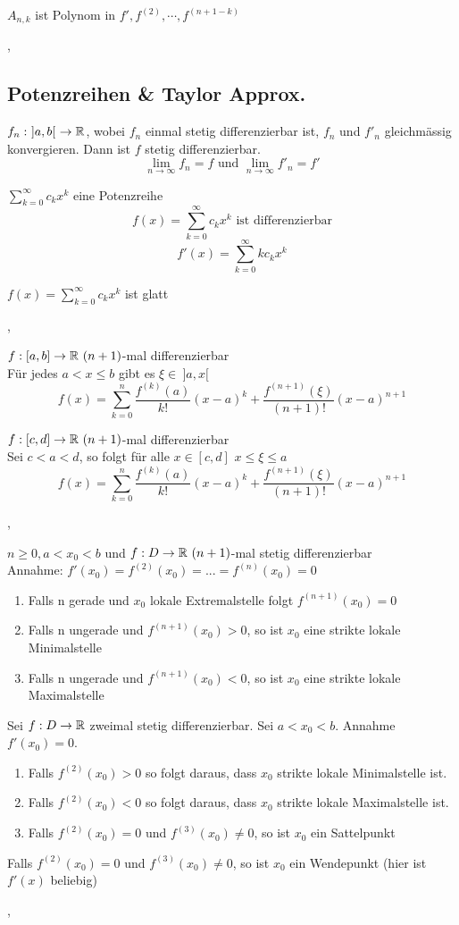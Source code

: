 \Bem $A_{n, k}$ ist Polynom in $f', f^{(2)}, \cdots , f^{(n + 1 - k)}$

\sep

\subsection{Potenzreihen \& Taylor Approx.}

\Satz[4.4.1] $f_n : \ ]a, b[ \ \rightarrow \mathbb{R}$, wobei $f_n$ einmal stetig differenzierbar ist, $f_n$ und $f'_n$ gleichmässig konvergieren. Dann ist $f$ stetig differenzierbar.
\[ \lim\limits_{n \rightarrow \infty} f_n = f \text{ und } \lim\limits_{n \rightarrow \infty} f'_n = f' \]

\Satz[4.4.2] $ \sum_{k= 0}^\infty c_k x^k$ eine Potenzreihe
\[ f(x) = \sum_{k= 0}^\infty c_k x^k \text{ ist differenzierbar} \]
\[f'(x) = \sum_{k= 0}^\infty k c_k x^k\]

\Korollar[4.4.3] $f(x) = \sum_{k= 0}^\infty c_k x^k$ ist glatt 

\sep

\Satz[4.4.5] $f : [a,b] \rightarrow \mathbb{R} \ (n + 1)$-mal differenzierbar \\
Für jedes $a < x \leq b$ gibt es $\xi \in \ ]a,x[ \ $
\[ f(x) = \sum_{k=0}^n \frac{f^{(k)}(a)}{k!} (x-a)^k  + \frac{f^{(n + 1)}(\xi)}{(n + 1)!} (x - a)^{n + 1} \]

\Korollar[4.4.6] $f : [c,d] \rightarrow \mathbb{R} \ (n + 1)$-mal differenzierbar \\
Sei $c < a < d$, so folgt für alle $x \in [c,d]$ $x \leq \xi \leq a$
\[ f(x) = \sum_{k=0}^n \frac{f^{(k)}(a)}{k!} (x-a)^k  + \frac{f^{(n + 1)}(\xi)}{(n + 1)!} (x - a)^{n + 1} \]

\sep

\Korollar[4.4.7] $n \geq 0, a < x_0 < b$ und $f : D \rightarrow \mathbb{R} \ (n + 1)$-mal stetig differenzierbar \\
Annahme: $f'(x_0) = f^{(2)}(x_0) = \text{...} = f^{(n)} (x_0) = 0$
\begin{enumerate}
\item Falls n gerade und $x_0$ lokale Extremalstelle folgt $f^{(n + 1)}(x_0) = 0$
\item Falls n ungerade und $f^{(n + 1)}(x_0)  > 0$, so ist $x_0$ eine strikte lokale Minimalstelle
\item Falls n ungerade und $f^{(n + 1)}(x_0)  < 0$, so ist $x_0$ eine strikte lokale Maximalstelle
\end{enumerate}

\Korollar[4.4.8] Sei $f : D \rightarrow \mathbb{R}$ zweimal stetig differenzierbar. Sei $ a < x_0 < b $. Annahme $f'(x_0) = 0$.
\begin{enumerate}
\item Falls $f^{(2)}(x_0) > 0$ so folgt daraus, dass $x_0$ strikte lokale Minimalstelle ist.
\item Falls $f^{(2)}(x_0) < 0$ so folgt daraus, dass $x_0$ strikte lokale Maximalstelle ist.
\item Falls $f^{(2)}(x_0) = 0$ und $f^{(3)}(x_0) \neq 0$, so ist $x_0$ ein Sattelpunkt
\end{enumerate}

\Bem Falls $f^{(2)}(x_0) = 0$ und $f^{(3)}(x_0) \neq 0$, so ist $x_0$ ein Wendepunkt (hier ist $f'(x)$ beliebig)

\sep